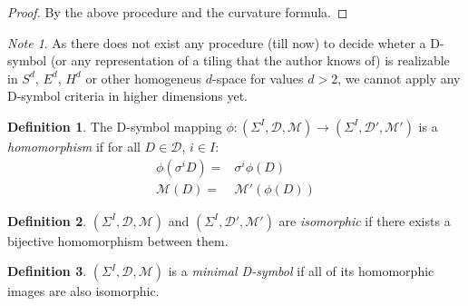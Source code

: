\documentclass[12pt,a4paper]{article}
\numberwithin{equation}{section}
\theoremstyle{plain}%
\theoremstyle{definition}
\newtheorem{defn}{Definition}[section]
\theoremstyle{remark}
\newtheorem*{note}{Note}
\begin{document}
\begin{proof}
  By the above procedure and the curvature formula.

%
\end{proof}

\begin{note}
  As there does not exist any procedure (till now) to decide wheter a D-symbol
  (or any representation of a tiling that the author knows of) is realizable in
  $S^d$, $E^d$, $H^d$ or other homogeneus $d$-space for values $d>2$, we cannot
  apply any D-symbol criteria in higher dimensions yet.
\end{note}

\begin{defn}
  The D-symbol mapping $\phi: (\Sigma^I,\mathcal{D},\mathcal{M}) \rightarrow
  (\Sigma^I,\mathcal{D}',\mathcal{M}')$ is a {\em homomorphism} if for all $D\in
  \mathcal{D}$, $i \in I$:
  \begin{align}
    \phi(\sigma^iD)= & \sigma^i\phi(D) \\
    \mathcal{M}(D)= & \mathcal{M}'(\phi(D))
  \end{align}
\end{defn}


\begin{defn}
  $(\Sigma^I,\mathcal{D},\mathcal{M})$ and
  $(\Sigma^I,\mathcal{D}',\mathcal{M}')$ are {\em isomorphic} if there exists a
  bijective homomorphism between them.
\end{defn}


\begin{defn}
  $(\Sigma^I,\mathcal{D},\mathcal{M})$ is a {\em minimal D-symbol} if all of its
  homomorphic images are also isomorphic.
\end{defn}
\end{document}
